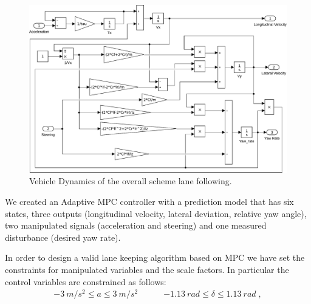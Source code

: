 \begin{figure}[!h]
	\centering
	\includegraphics[width=\textwidth]{./figure/lane_following_AMPC_vehicle_dynamics.pdf}
	\caption{Vehicle Dynamics of the overall scheme lane following.}
	\label{fig:scheme_lane_following_vehicle_dynamics}
\end{figure}
We created an Adaptive MPC controller with a prediction model that has six states, three outputs (longitudinal velocity, lateral deviation, relative yaw angle), two manipulated signals (acceleration and steering) and one measured disturbance (desired yaw rate).

In order to design a valid lane keeping algorithm based on MPC we have set the constraints for manipulated variables and the scale factors. In particular the control
variables are constrained as follows:
\begin{equation}
\label{eqn:constraint_LKA}
\begin{array}{cc}
	\SI{-3}{m/s^2}\leq a\leq\SI{3}{m/s^2}\qquad\quad
	\SI{-1.13}{rad}\leq \delta \leq \SI{1.13}{rad}\;,
\end{array}
\end{equation}

